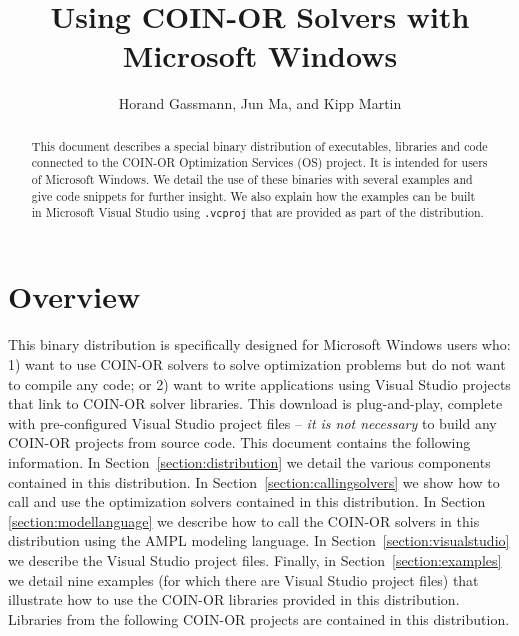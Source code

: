 \documentclass[11pt]{article}
\renewcommand{\_}{{\char"5F}}
\renewcommand{\{}{{\char"7B}}
\renewcommand{\}}{{\char"7D}}
\renewcommand{\^}{{\char"0D}}
\renewcommand{\'}{{\char"0D}}
\begin{document}
\title{Using COIN-OR Solvers with Microsoft Windows}
\vskip 2in
\author{Horand Gassmann, Jun Ma,  and  Kipp Martin}
\maketitle

\begin{abstract}
This document describes a special binary distribution of executables, libraries and code 
connected to the COIN-OR Optimization Services (OS) project. It is intended for users of 
Microsoft Windows. We detail the use of these binaries with several examples and give code snippets
for further insight. We also explain how the examples can be built in Microsoft Visual Studio 
using {\tt .vcproj} that are provided as part of the distribution.

\end{abstract}


\newpage


\section{Overview}\label{section:overview}
This binary distribution is specifically designed for Microsoft Windows users who: 
1) want to use COIN-OR solvers to solve optimization problems but do not want to compile any code; 
or 2) want to write applications using Visual Studio projects that link to COIN-OR solver libraries.  
This download is plug-and-play, complete with pre-configured Visual Studio project 
files -- {\it it is not necessary} to build any COIN-OR projects from source code.  
This document contains the following information. In Section~\ref{section:distribution} we
detail the various components contained in this distribution. In Section~\ref{section:callingsolvers}  
we show how to call and use the optimization solvers contained in this distribution.  
In Section \ref{section:modellanguage} we describe how to call the COIN-OR solvers 
in this distribution using the AMPL modeling language. In Section~\ref{section:visualstudio} 
we describe the Visual Studio project files.  Finally, in Section~\ref{section:examples} 
we detail nine examples (for which there are Visual Studio project files) that illustrate 
how to use the COIN-OR libraries provided in this distribution.  Libraries from the following 
COIN-OR projects are contained in this distribution.
\end{document}
